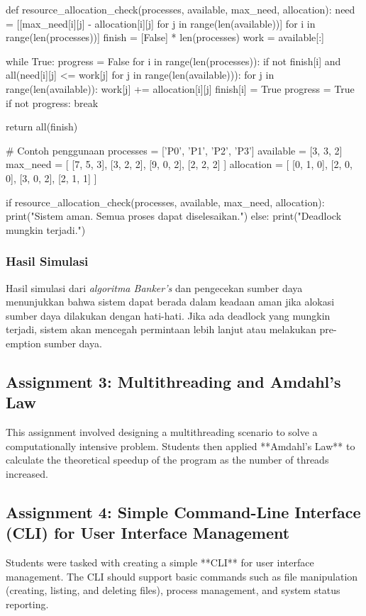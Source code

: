 \documentclass[12pt]{article}
\begin{document}
\begin{python}[language=Python, caption=Implementasi Pengecekan Alokasi Sumber Daya]
def resource_allocation_check(processes, available, max_need, allocation):
    need = [[max_need[i][j] - allocation[i][j] for j in range(len(available))] for i in range(len(processes))]
    finish = [False] * len(processes)
    work = available[:]
    
    while True:
        progress = False
        for i in range(len(processes)):
            if not finish[i] and all(need[i][j] <= work[j] for j in range(len(available))):
                for j in range(len(available)):
                    work[j] += allocation[i][j]
                finish[i] = True
                progress = True
        if not progress:
            break

    return all(finish)

# Contoh penggunaan
processes = ['P0', 'P1', 'P2', 'P3']
available = [3, 3, 2]
max_need = [
    [7, 5, 3],
    [3, 2, 2],
    [9, 0, 2],
    [2, 2, 2]
]
allocation = [
    [0, 1, 0],
    [2, 0, 0],
    [3, 0, 2],
    [2, 1, 1]
]

if resource_allocation_check(processes, available, max_need, allocation):
    print("Sistem aman. Semua proses dapat diselesaikan.")
else:
    print("Deadlock mungkin terjadi.")
\end{python}

\subsubsection{Hasil Simulasi}
Hasil simulasi dari \textit{algoritma Banker's} dan pengecekan sumber daya menunjukkan bahwa sistem dapat berada dalam keadaan aman jika alokasi sumber daya dilakukan dengan hati-hati. Jika ada deadlock yang mungkin terjadi, sistem akan mencegah permintaan lebih lanjut atau melakukan pre-emption sumber daya.

\subsection{Assignment 3: Multithreading and Amdahl's Law}
This assignment involved designing a multithreading scenario to solve a computationally intensive problem. Students then applied **Amdahl's Law** to calculate the theoretical speedup of the program as the number of threads increased.

\subsection{Assignment 4: Simple Command-Line Interface (CLI) for User Interface Management}
Students were tasked with creating a simple **CLI** for user interface management. The CLI should support basic commands such as file manipulation (creating, listing, and deleting files), process management, and system status reporting.
\end{document}
